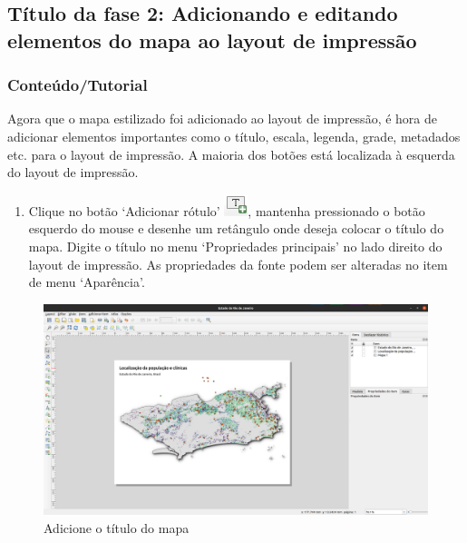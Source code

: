 \documentclass[
]{book}
\providecommand{\tightlist}{%
  \setlength{\itemsep}{0pt}\setlength{\parskip}{0pt}}
\begin{document}
\hypertarget{tuxedtulo-da-fase-2-adicionando-e-editando-elementos-do-mapa-ao-layout-de-impressuxe3o}{%
\subsection{Título da fase 2: Adicionando e editando elementos do mapa ao layout de impressão}\label{tuxedtulo-da-fase-2-adicionando-e-editando-elementos-do-mapa-ao-layout-de-impressuxe3o}}

\hypertarget{conteuxfadotutorial}{%
\subsubsection{\texorpdfstring{\textbf{Conteúdo/Tutorial}}{Conteúdo/Tutorial}}\label{conteuxfadotutorial}}

Agora que o mapa estilizado foi adicionado ao layout de impressão, é hora de adicionar elementos importantes como o título, escala, legenda, grade, metadados etc. para o layout de impressão. A maioria dos botões está localizada à esquerda do layout de impressão.

\begin{enumerate}
\def\labelenumi{\arabic{enumi}.}
\tightlist
\item
  Clique no botão `Adicionar rótulo' \includegraphics{media/modulo5/add_title.png}, mantenha pressionado o botão esquerdo do mouse e desenhe um retângulo onde deseja colocar o título do mapa. Digite o título no menu `Propriedades principais' no lado direito do layout de impressão. As propriedades da fonte podem ser alteradas no item de menu `Aparência'.
\end{enumerate}

\begin{figure}
\centering
\includegraphics{media/modulo5/print-layout-with-title.png}
\caption{Adicione o título do mapa}
\end{figure}
\end{document}
